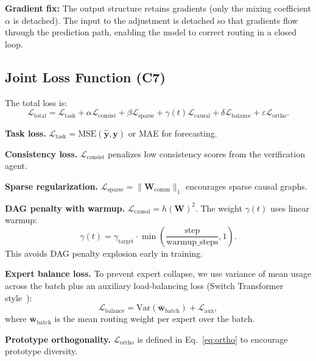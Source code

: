 \textbf{Gradient fix:} The output structure retains gradients (only the mixing coefficient $\alpha$ is detached). The input to the adjustment is detached so that gradients flow through the prediction path, enabling the model to correct routing in a closed loop.

\subsection{Joint Loss Function (C7)}
\label{sec:loss}

The total loss is:
\begin{equation}
\label{eq:total_loss}
\mathcal{L}_{\text{total}} = \mathcal{L}_{\text{task}} + \alpha \mathcal{L}_{\text{consist}} + \beta \mathcal{L}_{\text{sparse}} + \gamma(t) \mathcal{L}_{\text{causal}} + \delta \mathcal{L}_{\text{balance}} + \varepsilon \mathcal{L}_{\text{ortho}}.
\end{equation}

\textbf{Task loss.} $\mathcal{L}_{\text{task}} = \text{MSE}(\hat{\mathbf{y}}, \mathbf{y})$ or MAE for forecasting.

\textbf{Consistency loss.} $\mathcal{L}_{\text{consist}}$ penalizes low consistency scores from the verification agent.

\textbf{Sparse regularization.} $\mathcal{L}_{\text{sparse}} = \|\mathbf{W}_{\text{comm}}\|_1$ encourages sparse causal graphs.

\textbf{DAG penalty with warmup.} $\mathcal{L}_{\text{causal}} = h(\mathbf{W})^2$. The weight $\gamma(t)$ uses linear warmup:
\begin{equation}
\label{eq:gamma}
\gamma(t) = \gamma_{\text{target}} \cdot \min\left( \frac{\text{step}}{\text{warmup\_steps}}, 1 \right).
\end{equation}
This avoids DAG penalty explosion early in training.

\textbf{Expert balance loss.} To prevent expert collapse, we use variance of mean usage across the batch plus an auxiliary load-balancing loss (Switch Transformer style~\cite{fedus2022switch}):
\begin{equation}
\mathcal{L}_{\text{balance}} = \text{Var}(\bar{\mathbf{w}}_{\text{batch}}) + \mathcal{L}_{\text{aux}},
\end{equation}
where $\bar{\mathbf{w}}_{\text{batch}}$ is the mean routing weight per expert over the batch.

\textbf{Prototype orthogonality.} $\mathcal{L}_{\text{ortho}}$ is defined in Eq.~\eqref{eq:ortho} to encourage prototype diversity.

